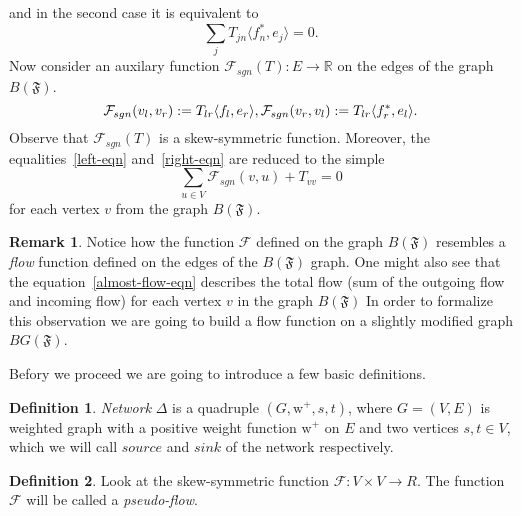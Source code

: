 \documentclass[12pt]{article}
\newcommand\inner[2]{\langle #1, #2 \rangle}
\theoremstyle{definition}
\newtheorem{remark}{Remark}
\newtheorem{definition}{Definition}
\newcommand{\fsys}{\mathfrak{F}}
\newcommand{\wtpos}{\mathrm{w}^+}
\newcommand{\flow}{\mathcal{F}}
\newcommand{\flowsgn}{\mathcal{F}_{sgn}}
\newcommand{\source}{\mathit{source}}
\newcommand{\sink}{\mathit{sink}}
\newcommand{\net}{\Delta}
\numberwithin{remark}{section}
\numberwithin{theorem}{section}
\numberwithin{prop}{section}
\numberwithin{equation}{section}
\numberwithin{lemma}{section}
\numberwithin{prop_under_lemma}{lemma}
\begin{document}
    and in the second case it is equivalent to 
    \begin{equation}
        \label{right-eqn}
        \sum_j T_{jn} \inner{f^*_n}{e_j} = 0.
    \end{equation}
    Now consider an auxilary function $\flowsgn(T): E \to \mathbb{R}$ 
    on the edges of the graph $B(\fsys)$.
    \begin{equation*}
        \flowsgn(v_l, v_r) := T_{lr} \inner{f_l}{e_r},\\
        \flowsgn(v_r, v_l) := T_{lr} \inner{f^*_r}{e_l}.
    \end{equation*}
    Observe that $\flowsgn(T)$ is a skew-symmetric function.
    Moreover, the equalities~\eqref{left-eqn} and~\eqref{right-eqn} are reduced to the simple
    \begin{equation}
      \label{almost-flow-eqn}
      \sum_{u \in V} \flowsgn(v, u) + T_{vv} = 0
    \end{equation}
    for each vertex $v$ from the graph $B(\fsys)$.
    \begin{remark}
      Notice how the function $\flow$ defined on the graph $B(\fsys)$ resembles
      a \emph{flow} function defined on the edges of the $B(\fsys)$ graph.
      One might also see that the equation~\eqref{almost-flow-eqn} describes the total flow (sum of the outgoing flow and incoming flow) 
      for each vertex $v$ in the graph $B(\fsys)$
      In order to formalize this observation we are going to build a flow function
      on a slightly modified graph $BG(\fsys)$.
    \end{remark}
    Befory we proceed we are going to introduce a few basic definitions.
    \begin{definition}
        \textit{Network} $\net$ is a quadruple $(G, \wtpos, s, t)$, where $G = (V, E)$ is weighted graph 
        with a positive weight function $\wtpos$ on $E$ and two vertices $s, t \in V$, which
        we will call $\source$ and $\sink$ of the network respectively.
    \end{definition}
    \begin{definition}
        Look at the skew-symmetric function $\flow: V \times V \to R$.
        The function $\flow$ will be called a \textit{pseudo-flow}.
    \end{definition}
\end{document}

